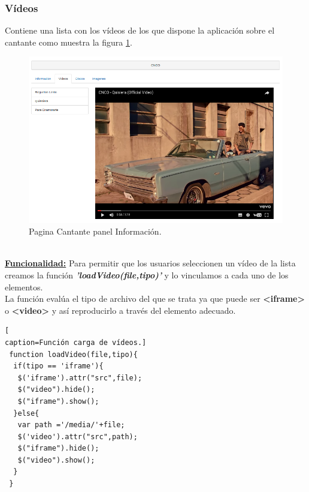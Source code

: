 \subsubsection*{Vídeos}
Contiene una lista con los vídeos de los que dispone la aplicación sobre el cantante como muestra la figura \ref{fig:Video_Cantante}.
\begin{figure}[!h]
\begin{center}
   \includegraphics[width=0.45\linewidth]{Figures/videos_Cantante}
  \decoRule
  \caption[Cantante panel Información]{Pagina Cantante panel Información.}
\label{fig:Video_Cantante}
\end{center}
\end{figure}
\\\underline{\textbf{Funcionalidad:}} Para permitir que los usuarios seleccionen un vídeo de la lista creamos la función \textit{\textbf{'loadVideo(file,tipo)'}} y lo vinculamos a cada uno de los elementos.
\\La función evalúa el tipo de archivo del que se trata ya que puede ser \textbf{<iframe>} o \textbf{<video>} y así reproducirlo a través del elemento adecuado.
\begin{lstlisting}[
caption=Función carga de vídeos.]
 function loadVideo(file,tipo){
  if(tipo == 'iframe'){
   $('iframe').attr("src",file);
   $("video").hide();
   $("iframe").show();
  }else{
   var path ='/media/'+file;
   $('video').attr("src",path);
   $("iframe").hide();
   $("video").show();
  }
 }
\end{lstlisting}
